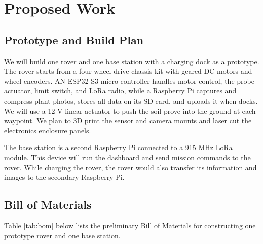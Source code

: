 \documentclass[12pt, letterpaper]{article}
\begin{document}
\section{Proposed Work}

\subsection{Prototype and Build Plan}

We will build one rover and one base station with a charging dock as a prototype. The rover starts from a four-wheel-drive chassis kit with geared DC motors and wheel encoders. AN ESP32-S3 micro controller handles motor control, the probe actuator, limit switch, and LoRa radio, while a Raspberry Pi captures and compress plant photos, stores all data on its SD card, and uploads it when docks. We will use a 12 V linear actuator to push the soil prove into the ground at each waypoint. We plan to 3D print the sensor and camera mounts and laser cut the electronics enclosure panels.

The base station is a second Raspberry Pi connected to a 915 MHz LoRa module. This device will run the dashboard and send mission commands to the rover. While charging the rover, the rover would also transfer its information and images to the secondary Raspberry Pi.

\subsection{Bill of Materials}
Table \ref{tab:bom} below lists the preliminary Bill of Materials for constructing one prototype rover and one base station. 
\end{document}

